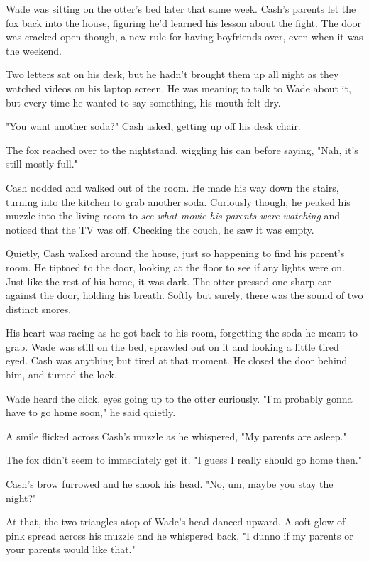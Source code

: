 \secdiv

Wade was sitting on the otter's bed later that same week. Cash's parents let the fox back into the house, figuring he'd learned his lesson about the fight. The door was cracked open though, a new rule for having boyfriends over, even when it was the weekend.

Two letters sat on his desk, but he hadn't brought them up all night as they watched videos on his laptop screen. He was meaning to talk to Wade about it, but every time he wanted to say something, his mouth felt dry.

"You want another soda?" Cash asked, getting up off his desk chair.

The fox reached over to the nightstand, wiggling his can before saying, "Nah, it's still mostly full."

Cash nodded and walked out of the room. He made his way down the stairs, turning into the kitchen to grab another soda. Curiously though, he peaked his muzzle into the living room to \emph{see what movie his parents were watching} and noticed that the TV was off. Checking the couch, he saw it was empty.

Quietly, Cash walked around the house, just so happening to find his parent's room. He tiptoed to the door, looking at the floor to see if any lights were on. Just like the rest of his home, it was dark. The otter pressed one sharp ear against the door, holding his breath. Softly but surely, there was the sound of two distinct snores.

His heart was racing as he got back to his room, forgetting the soda he meant to grab. Wade was still on the bed, sprawled out on it and looking a little tired eyed. Cash was anything but tired at that moment. He closed the door behind him, and turned the lock.

Wade heard the click, eyes going up to the otter curiously. "I'm probably gonna have to go home soon," he said quietly.

A smile flicked across Cash's muzzle as he whispered, "My parents are asleep."

The fox didn't seem to immediately get it. "I guess I really should go home then."

Cash's brow furrowed and he shook his head. "No, um, maybe you stay the night?"

At that, the two triangles atop of Wade's head danced upward. A soft glow of pink spread across his muzzle and he whispered back, "I dunno if my parents or your parents would like that."

